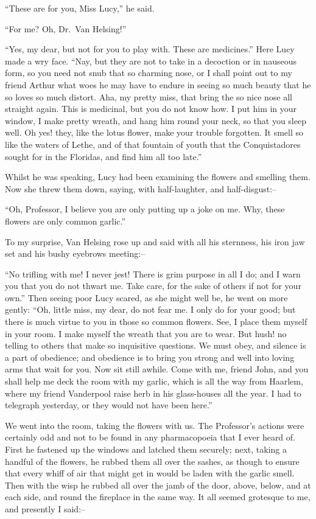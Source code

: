 \documentclass[12pt,openright]{book}
\begin{document}
“These are for you, Miss Lucy,” he said.

“For me? Oh, Dr. Van Helsing!”

“Yes, my dear, but not for you to play with. These are medicines.” Here Lucy made a wry face. “Nay, but they are not to take in a decoction or in nauseous form, so you need not snub that so charming nose, or I shall point out to my friend Arthur what woes he may have to endure in seeing so much beauty that he so loves so much distort. Aha, my pretty miss, that bring the so nice nose all straight again. This is medicinal, but you do not know how. I put him in your window, I make pretty wreath, and hang him round your neck, so that you sleep well. Oh yes! they, like the lotus flower, make your trouble forgotten. It smell so like the waters of Lethe, and of that fountain of youth that the Conquistadores sought for in the Floridas, and find him all too late.”

Whilst he was speaking, Lucy had been examining the flowers and smelling them. Now she threw them down, saying, with half-laughter, and half-disgust:–

“Oh, Professor, I believe you are only putting up a joke on me. Why, these flowers are only common garlic.”

To my surprise, Van Helsing rose up and said with all his sternness, his iron jaw set and his bushy eyebrows meeting:–

“No trifling with me! I never jest! There is grim purpose in all I do; and I warn you that you do not thwart me. Take care, for the sake of others if not for your own.” Then seeing poor Lucy scared, as she might well be, he went on more gently: “Oh, little miss, my dear, do not fear me. I only do for your good; but there is much virtue to you in those so common flowers. See, I place them myself in your room. I make myself the wreath that you are to wear. But hush! no telling to others that make so inquisitive questions. We must obey, and silence is a part of obedience; and obedience is to bring you strong and well into loving arms that wait for you. Now sit still awhile. Come with me, friend John, and you shall help me deck the room with my garlic, which is all the way from Haarlem, where my friend Vanderpool raise herb in his glass-houses all the year. I had to telegraph yesterday, or they would not have been here.”

We went into the room, taking the flowers with us. The Professor’s actions were certainly odd and not to be found in any pharmacopoeia that I ever heard of. First he fastened up the windows and latched them securely; next, taking a handful of the flowers, he rubbed them all over the sashes, as though to ensure that every whiff of air that might get in would be laden with the garlic smell. Then with the wisp he rubbed all over the jamb of the door, above, below, and at each side, and round the fireplace in the same way. It all seemed grotesque to me, and presently I said:–
\end{document}
